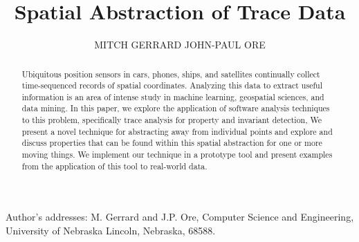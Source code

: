 \documentclass[prodmode,acmtecs]{acmsmall} %
\begin{document}

\title{Spatial Abstraction of Trace Data}
\author{MITCH GERRARD
JOHN-PAUL ORE
}

\begin{abstract}
Ubiquitous position sensors in cars, phones, ships, and satellites continually collect time-sequenced records of spatial coordinates.
Analyzing this data to extract useful information is an area of intense study in machine learning, geospatial sciences, and data mining.
In this paper, we explore the application of software analysis techniques to this problem, specifically trace analysis for property and invariant detection, 
We present a novel technique for abstracting away from individual points and explore and discuss properties that can be found within this spatial abstraction for one or more moving things.
We implement our technique in a prototype tool and present examples from the application of this tool to real-world data.
\end{abstract}




\begin{bottomstuff}


Author's addresses: M. Gerrard and J.P. Ore, Computer Science and Engineering,
University of Nebraska
Lincoln, Nebraska, 68588. 
\end{bottomstuff}

\maketitle
\end{document}

